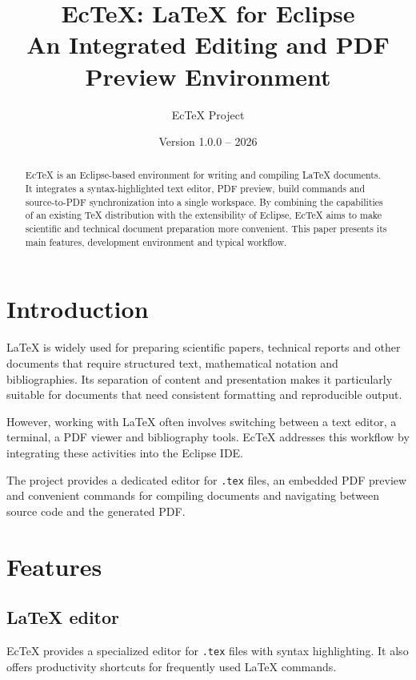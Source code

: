 \documentclass[11pt,a4paper]{article}
\title{\textbf{EcTeX: LaTeX for Eclipse}\\
\large An Integrated Editing and PDF Preview Environment}
\author{EcTeX Project}
\date{Version 1.0.0 -- 2026}
\begin{document}
\maketitle

\begin{abstract}
EcTeX is an Eclipse-based environment for writing and compiling
LaTeX documents. It integrates a syntax-highlighted text editor,
PDF preview, build commands and source-to-PDF synchronization
into a single workspace. By combining the capabilities of an
existing TeX distribution with the extensibility of Eclipse,
EcTeX aims to make scientific and technical document preparation
more convenient. This paper presents its main features,
development environment and typical workflow.
\end{abstract}

\tableofcontents

\section{Introduction}

LaTeX is widely used for preparing scientific papers,
technical reports and other documents that require
structured text, mathematical notation and bibliographies.
Its separation of content and presentation makes it
particularly suitable for documents that need consistent
formatting and reproducible output.

However, working with LaTeX often involves switching
between a text editor, a terminal, a PDF viewer and
bibliography tools. EcTeX addresses this workflow by
integrating these activities into the Eclipse IDE.

The project provides a dedicated editor for \texttt{.tex}
files, an embedded PDF preview and convenient commands
for compiling documents and navigating between source
code and the generated PDF.

\section{Features}

\subsection{LaTeX editor}

EcTeX provides a specialized editor for \texttt{.tex} files
with syntax highlighting. It also offers productivity
shortcuts for frequently used LaTeX commands.
\end{document}
